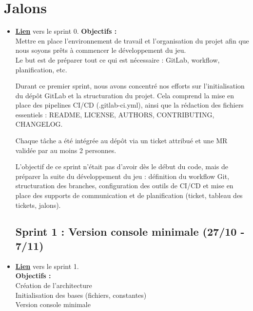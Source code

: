 \documentclass[a4paper, 12pt]{article}
\begin{document}
    \section{Jalons}

        \begin{itemize}[itemsep=1cm]
            \subsection{Sprint 0 : Initialisation du projet (18/10 - 27/10)}
                \item \href{https://moule.informatique.u-paris.fr/mesnildr/projet-worms/-/milestones/1#tab-issues}{\textbf{Lien}} vers le sprint 0.
                \newline
                \textbf{Objectifs :}\\
                    Mettre en place l'environnement de travail et l'organisation du projet afin que nous soyons prêts à commencer le développement du jeu.\\
                    Le but est de préparer tout ce qui est nécessaire : GitLab, workflow, planification, etc.
                \newline

                Durant ce premier sprint, nous avons concentré nos efforts sur l’initialisation du dépôt GitLab et la structuration du projet.
                Cela comprend la mise en place des pipelines CI/CD (.gitlab-ci.yml), ainsi que la rédaction des fichiers essentiels : README, LICENSE, AUTHORS, CONTRIBUTING, CHANGELOG.
                
                Chaque tâche a été intégrée au dépôt via un ticket attribué et une MR validée par au moins 2 personnes.

                L’objectif de ce sprint n’était pas d'avoir dès le début du code, mais de préparer la suite du développement du jeu : définition du workflow Git, structuration des branches, configuration des outils de CI/CD et mise en place des supports de communication et de planification (ticket, tableau des tickets, jalons).

            \subsection{Sprint 1 : Version console minimale (27/10 - 7/11)}
                \item \href{https://moule.informatique.u-paris.fr/mesnildr/projet-worms/-/milestones/2#tab-issues}{\textbf{Lien}} vers le sprint 1.\\
                \newline
                \textbf{Objectifs :}\\
                    Création de l'architecture\\
                    Initialisation des bases (fichiers, constantes)\\
                    Version console minimale
                \newline


\end{itemize}
\end{document}
